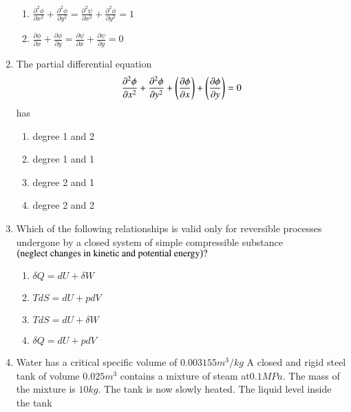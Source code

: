 \documentclass[journal]{IEEEtran}
\begin{document}
\begin{enumerate}
\begin{enumerate}
        \item $\frac{\partial^{2}\phi}{\partial x^{2}}+\frac{\partial^{2}\phi}{\partial y^{2}}=\frac{\partial^{2}\psi}{\partial x^{2}}+\frac{\partial^{2}\phi}{\partial y^{2}}=1$
        \item$\frac{\partial\phi}{\partial x}+\frac{\partial\phi}{\partial y}=\frac{\partial\psi}{\partial x}+\frac{\partial\psi}{\partial y}=0$
\end{enumerate}
\bigskip
\item The partial differential equation 
\begin{align*}
    \frac{\partial^{2}\phi}{\partial x^{2}}+\frac{\partial^{2}\phi}{\partial y^{2}}+\left(\frac{\partial\phi}{\partial x}\right)+\left(\frac{\partial\phi}{\partial y}\right)=0
\end{align*}
has
\begin{multicols}{2}
    \begin{enumerate}
        \item degree 1 and 2
        \item degree 1 and 1
        \item degree 2 and 1
        \item degree 2 and 2
    \end{enumerate}
\end{multicols}
\bigskip
\item Which of the following relationships is valid only for reversible processes undergone by a closed system of simple compressible substance $\left(\text{neglect changes in kinetic and potential energy}\right)?$
\begin{multicols}{2}
    \begin{enumerate}
        \item $\delta Q = dU+\delta W $
        \item $T dS=dU+ p dV$
        \item $T dS=dU +\delta W $
        \item $\delta Q =dU+p dV$
    \end{enumerate}
\end{multicols}
\bigskip
\item  Water has a critical specific volume of $0.003155m ^ {3} / kg$ A closed and rigid steel tank of volume $0.025 m^{3}$ contains a mixture of steam at$ 0.1 MPa.$ The mass of the mixture is $10 kg.$ The tank is now slowly heated. The liquid level inside the tank


\end{enumerate}
\end{document}
